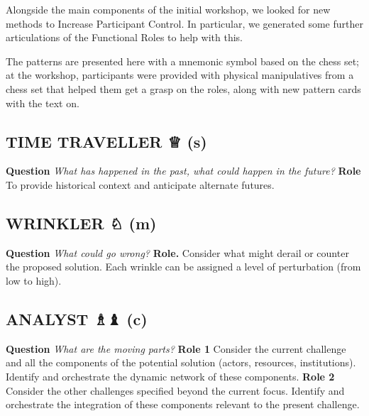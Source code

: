 \documentclass[acmlarge,timestamp]{acmart}
\newcommand{\sensory}{(s)}
\newcommand{\cognitive}{(c)}
\newcommand{\motor}{(m)}
\begin{document}
Alongside the main components of the initial workshop, we looked for
new methods to {\sc Increase Participant Control}.  In particular, we
generated some further articulations of the {\sc Functional Roles} to
help with this.

The patterns are presented here with a mnemonic symbol based on the
chess set; at the workshop, participants were provided with physical
manipulatives from a chess set that helped them get a grasp on the
roles, along with new pattern cards with the text on.

\subsection*{TIME TRAVELLER {\chess ♕} {\hfill \sensory}}

\textbf{Question} \emph{What has happened in the past, what could
happen in the future?}\newline
\textbf{Role} To provide historical context and
anticipate alternate futures.

\subsection*{WRINKLER {\chess ♘} {\hfill \motor}}

\textbf{Question} \emph{What could go wrong? }\newline
\textbf{Role.} Consider what might derail or counter
the proposed solution.  Each wrinkle can be assigned a level of
perturbation (from low to high).

\subsection*{ANALYST {\chess ♗♝} {\hfill \cognitive}}

\textbf{Question} \emph{What are the moving parts?}\newline
\textbf{Role 1} Consider the current challenge and all the components
of the potential solution (actors, resources, institutions). Identify
and orchestrate the dynamic network of these components.\newline
\textbf{Role 2} Consider the other challenges specified beyond the
current focus.  Identify and orchestrate the integration of these
components relevant to the present challenge.
\end{document}
